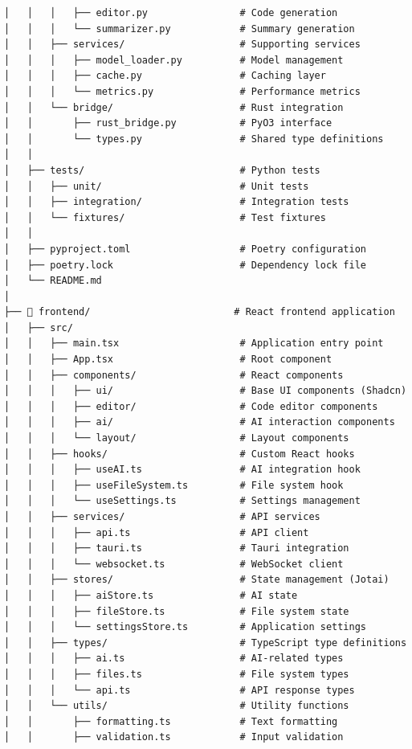 \begin{lstlisting}[language=text, caption=Complete Repository Structure]
│   │   │   ├── editor.py                # Code generation
│   │   │   └── summarizer.py            # Summary generation
│   │   ├── services/                    # Supporting services
│   │   │   ├── model_loader.py          # Model management
│   │   │   ├── cache.py                 # Caching layer
│   │   │   └── metrics.py               # Performance metrics
│   │   └── bridge/                      # Rust integration
│   │       ├── rust_bridge.py           # PyO3 interface
│   │       └── types.py                 # Shared type definitions
│   │
│   ├── tests/                           # Python tests
│   │   ├── unit/                        # Unit tests
│   │   ├── integration/                 # Integration tests
│   │   └── fixtures/                    # Test fixtures
│   │
│   ├── pyproject.toml                   # Poetry configuration
│   ├── poetry.lock                      # Dependency lock file
│   └── README.md
│
├── 📁 frontend/                         # React frontend application
│   ├── src/
│   │   ├── main.tsx                     # Application entry point
│   │   ├── App.tsx                      # Root component
│   │   ├── components/                  # React components
│   │   │   ├── ui/                      # Base UI components (Shadcn)
│   │   │   ├── editor/                  # Code editor components
│   │   │   ├── ai/                      # AI interaction components
│   │   │   └── layout/                  # Layout components
│   │   ├── hooks/                       # Custom React hooks
│   │   │   ├── useAI.ts                 # AI integration hook
│   │   │   ├── useFileSystem.ts         # File system hook
│   │   │   └── useSettings.ts           # Settings management
│   │   ├── services/                    # API services
│   │   │   ├── api.ts                   # API client
│   │   │   ├── tauri.ts                 # Tauri integration
│   │   │   └── websocket.ts             # WebSocket client
│   │   ├── stores/                      # State management (Jotai)
│   │   │   ├── aiStore.ts               # AI state
│   │   │   ├── fileStore.ts             # File system state
│   │   │   └── settingsStore.ts         # Application settings
│   │   ├── types/                       # TypeScript type definitions
│   │   │   ├── ai.ts                    # AI-related types
│   │   │   ├── files.ts                 # File system types
│   │   │   └── api.ts                   # API response types
│   │   └── utils/                       # Utility functions
│   │       ├── formatting.ts            # Text formatting
│   │       ├── validation.ts            # Input validation

\end{lstlisting}
